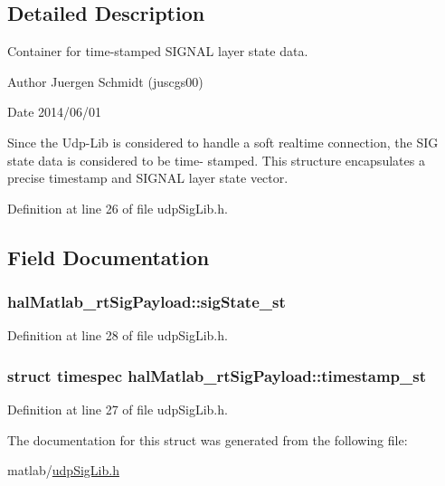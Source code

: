 \subsection{Detailed Description}
Container for time-\/stamped S\+I\+G\+N\+A\+L layer state data. 



 \begin{DoxyAuthor}{Author}
Juergen Schmidt (juscgs00) 
\end{DoxyAuthor}
\begin{DoxyDate}{Date}
2014/06/01
\end{DoxyDate}
Since the Udp-\/\+Lib is considered to handle a soft realtime connection, the S\+I\+G state data is considered to be time-\/ stamped. This structure encapsulates a precise timestamp and S\+I\+G\+N\+A\+L layer state vector.

Definition at line 26 of file udp\+Sig\+Lib.\+h.



\subsection{Field Documentation}
\hypertarget{structhalMatlab__rtSigPayload_acbe0c4752e7c359734effc1f17f5f494_acbe0c4752e7c359734effc1f17f5f494}{
\subsubsection[{sig\+State\+\_\+st}]{ hal\+Matlab\+\_\+rt\+Sig\+Payload\+::sig\+State\+\_\+st}}\label{structhalMatlab__rtSigPayload_acbe0c4752e7c359734effc1f17f5f494_acbe0c4752e7c359734effc1f17f5f494}


Definition at line 28 of file udp\+Sig\+Lib.\+h.

\hypertarget{structhalMatlab__rtSigPayload_acf78b49f8e27a0097931fe0e57d14819_acf78b49f8e27a0097931fe0e57d14819}{
\subsubsection[{timestamp\+\_\+st}]{\setlength{\rightskip}{0pt plus 5cm}struct timespec hal\+Matlab\+\_\+rt\+Sig\+Payload\+::timestamp\+\_\+st}}\label{structhalMatlab__rtSigPayload_acf78b49f8e27a0097931fe0e57d14819_acf78b49f8e27a0097931fe0e57d14819}


Definition at line 27 of file udp\+Sig\+Lib.\+h.



The documentation for this struct was generated from the following file\+:\begin{DoxyCompactItemize}
\item 
matlab/\hyperlink{udpSigLib_8h}{udp\+Sig\+Lib.\+h}\end{DoxyCompactItemize}
